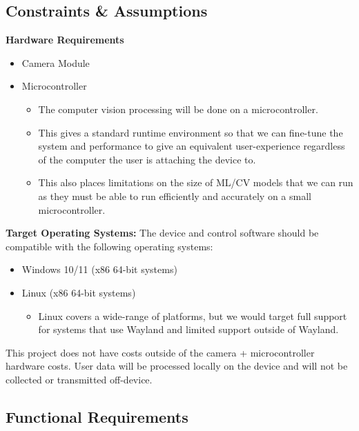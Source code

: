 \documentclass{article}
\begin{document}
\subsection{Constraints \& Assumptions}

\textbf{Hardware Requirements}

\begin{itemize}
\item Camera Module
\item Microcontroller
    \begin{itemize}
    \item The computer vision processing will be done on a microcontroller.
    \item This gives a standard runtime environment so that we can fine-tune the system and performance to give an equivalent user-experience regardless of the computer the user is attaching the device to.
    \item This also places limitations on the size of ML/CV models that we can run as they must be able to run efficiently and accurately on a small microcontroller.
    \end{itemize}
\end{itemize}

\textbf{Target Operating Systems:} The device and control software should be compatible with the following operating systems:

\begin{itemize}
\item Windows 10/11 (x86 64-bit systems)
\item Linux (x86 64-bit systems)
    \begin{itemize}
    \item Linux covers a wide-range of platforms, but we would target full support for systems that use Wayland and limited support outside of Wayland.
    \end{itemize}
\end{itemize}

This project does not have costs outside of the camera + microcontroller hardware costs. User data will be processed locally on the device and will not be collected or transmitted off-device.

\subsection{Functional Requirements}
\end{document}
